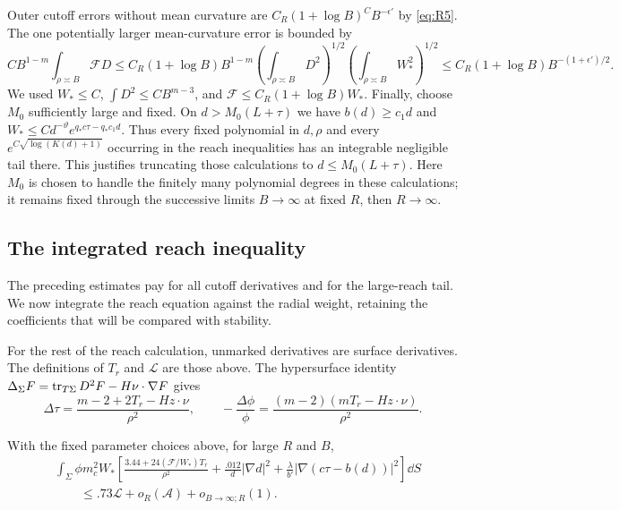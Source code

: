 Outer cutoff errors without mean curvature are
$C_R(1+\log B)^C B^{-\epsilon'}$ by \eqref{eq:R5}.
The one potentially larger mean-curvature error is bounded by
\[
 C B^{1-m}\int_{\rho\asymp B}\mathcal F D
 \le C_R(1+\log B)
 B^{1-m}\left(\int_{\rho\asymp B}D^2\right)^{1/2}
             \left(\int_{\rho\asymp B}W_*^2\right)^{1/2}
 \le C_R(1+\log B)B^{-(1+\epsilon')/2}.
\]
We used $W_*\le C$, $\int D^2\le C B^{m-3}$, and
$\mathcal F\le C_R(1+\log B)W_*$.
Finally, choose $M_0$ sufficiently large and fixed. On
$d>M_0(L+\tau)$ we have $b(d)\ge c_1d$ and
$W_*\le Cd^{-\vartheta}e^{q_*c\tau-q_*c_1d}$.
Thus every fixed polynomial in $d,\rho$ and every
$e^{C\sqrt{\log(K(d)+1)}}$ occurring in the reach inequalities
has an integrable negligible tail there. This justifies truncating
those calculations to $d\le M_0(L+\tau)$. Here $M_0$ is chosen to
handle the finitely many polynomial degrees in these calculations;
it remains fixed through the successive limits $B\to\infty$ at fixed
$R$, then $R\to\infty$.
\subsection{The integrated reach inequality}

The preceding estimates pay for all cutoff derivatives and for the
large-reach tail. We now integrate the reach equation against the
radial weight, retaining the coefficients that will be compared with
stability.


For the rest of the reach calculation, unmarked derivatives are surface
derivatives. The definitions of $T_r$ and $\mathcal L$ are those above.
The hypersurface identity
$\Delta_\Sigma F=\operatorname{tr}_{T\Sigma}D^2F-H\nu\cdot\nabla F$
gives
\[
 \Delta\tau=\frac{m-2+2T_r-Hz\cdot\nu}{\rho^2},
 \qquad
 -\frac{\Delta\phi}{\phi}
 =\frac{(m-2)(mT_r-Hz\cdot\nu)}{\rho^2}.
\]

\begin{lemma}\label{lem:radial-reach-budget}
With the fixed parameter choices above, for large $R$ and $B$,
\begin{equation}\label{eq:R6}
\begin{split}
 &\int_\Sigma\phi m_c^2W_*
 \left[
 \frac{3.44+24(\mathcal F/W_*)T_r}{\rho^2}
 +\frac{.012}{d}|\nabla d|^2
 +\frac{\lambda}{b'}|\nabla(c\tau-b(d))|^2
 \right]\dd S\\
 &\hspace{2em}\le .73\mathcal L+o_R(\mathcal A)+o_{B\to\infty;R}(1).
\end{split}
\end{equation}
\end{lemma}


